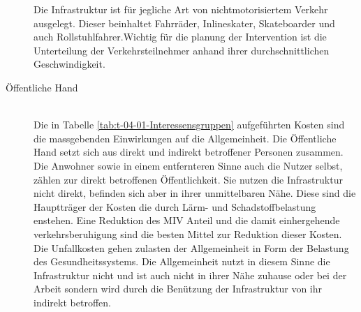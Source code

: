 \begin{description}
Die Infrastruktur ist für jegliche Art von nichtmotorisiertem Verkehr ausgelegt. Dieser beinhaltet Fahrräder, Inlineskater, Skateboarder und auch Rollstuhlfahrer.Wichtig für die planung der Intervention ist die Unterteilung der Verkehrsteilnehmer anhand ihrer durchschnittlichen Geschwindigkeit.
\item[Öffentliche Hand]\hfill \\
Die in Tabelle \ref{tab:t-04-01-Interessensgruppen} aufgeführten Kosten sind die massgebenden Einwirkungen auf die Allgemeinheit. Die Öffentliche Hand setzt sich aus direkt und indirekt betroffener Personen zusammen. 
Die Anwohner sowie in einem entfernteren Sinne auch die Nutzer selbst, zählen zur direkt betroffenen Öffentlichkeit. Sie nutzen die Infrastruktur nicht direkt, befinden sich aber in ihrer unmittelbaren Nähe. Diese sind die Hauptträger der Kosten die durch Lärm- und Schadstoffbelastung enstehen. Eine Reduktion des MIV Anteil und die damit einhergehende verkehrsberuhigung sind die besten Mittel zur Reduktion dieser Kosten.   \\
Die Unfallkosten gehen zulasten der Allgemeinheit in Form der Belastung des Gesundheitssystems. Die Allgemeinheit nutzt in diesem Sinne die Infrastruktur nicht und ist auch nicht in ihrer Nähe zuhause oder bei der Arbeit sondern wird durch die Benützung der Infrastruktur von ihr indirekt betroffen.
\end{description}




%

